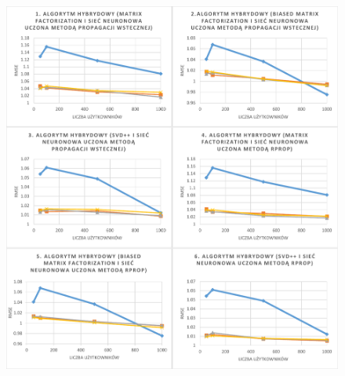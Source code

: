 \documentclass[twoside]{iisthesis}
\begin{document}
\begin{figure}[!ht]
	\centering
	\includegraphics[page=1,width=1\textwidth]{exphybrid_amazon2}
	\label{fig:exphybrid_amazon2a}
\end{figure}
\end{document}
